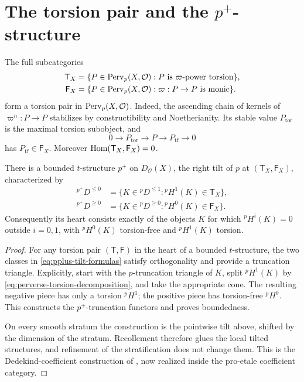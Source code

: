 \section{The torsion pair and the \texorpdfstring{\(p^+\)}{p+}-structure}

The full subcategories
\[
\begin{aligned}
  \mathsf T_X
    &=\{P\in\operatorname{Perv}_p(X,\mathcal O):P\text{ is }\varpi\text{-power torsion}\},\\
  \mathsf F_X
    &=\{P\in\operatorname{Perv}_p(X,\mathcal O):\varpi:P\to P\text{ is monic}\}.
\end{aligned}
\]
form a torsion pair in \(\operatorname{Perv}_p(X,\mathcal O)\).  Indeed, the ascending
chain of kernels of \(\varpi^n:P\to P\) stabilizes by constructibility and
Noetherianity.  Its stable value \(P_{\mathrm{tor}}\) is the maximal torsion
subobject, and
\[
  0\longrightarrow P_{\mathrm{tor}}\longrightarrow P
    \longrightarrow P_{\mathrm{tf}}\longrightarrow0
\tag{\thechapter.2}\label{eq:perverse-torsion-decomposition}
\]
has \(P_{\mathrm{tf}}\in\mathsf F_X\).  Moreover
\(\operatorname{Hom}(\mathsf T_X,\mathsf F_X)=0\).

\begin{theorem}
\label{thm:p-pplus-tilt}
There is a bounded \(t\)-structure \(p^+\) on \(D_{\mathcal O}(X)\), the
right tilt of \(p\) at \((\mathsf T_X,\mathsf F_X)\), characterized by
\begin{equation}
\begin{aligned}
 {}^{p^+}D^{\leq0}
   &=\{K\in{}^pD^{\leq1}:{}^pH^1(K)\in\mathsf T_X\},\\
 {}^{p^+}D^{\geq0}
   &=\{K\in{}^pD^{\geq0}:{}^pH^0(K)\in\mathsf F_X\}.
\end{aligned}
\label{eq:pplus-tilt-formulas}
\end{equation}
Consequently its heart consists exactly of the objects \(K\) for which
\({}^pH^i(K)=0\) outside \(i=0,1\), with
\({}^pH^0(K)\) torsion-free and \({}^pH^1(K)\) torsion.
\end{theorem}

\begin{proof}
For any torsion pair \((\mathsf T,\mathsf F)\) in the heart of a bounded
\(t\)-structure, the two classes in \eqref{eq:pplus-tilt-formulas} satisfy
orthogonality and provide a truncation triangle.  Explicitly, start with the
\(p\)-truncation triangle of \(K\), split \({}^pH^1(K)\) by
\eqref{eq:perverse-torsion-decomposition}, and take the appropriate cone.
The resulting negative piece has only a torsion \({}^pH^1\); the positive
piece has torsion-free \({}^pH^0\).  This constructs the \(p^+\)-truncation
functors and proves boundedness.

On every smooth stratum the construction is the pointwise tilt above,
shifted by the dimension of the stratum.  Recollement therefore glues the
local tilted structures, and refinement of the stratification does not
change them.  This is the Dedekind-coefficient construction of
\cite[\S3.3.4]{BBD}, now realized inside the pro-etale coefficient category.
\end{proof}

